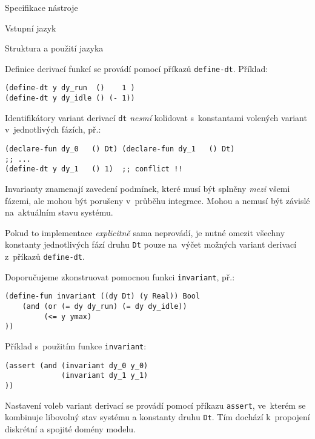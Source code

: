 \documentclass[thesis=M,czech]{FITthesis}[2012/06/26]
\newcommand{\id}[1]{\texttt{#1}}
\newcommand{\hl}[1]{\textit{#1}}
\begin{document}
\begin{section}{Specifikace nástroje}
\begin{subsection}{Vstupní jazyk}
\begin{subsubsection}{Struktura a použití jazyka}

\begin{paragraph}{Definice derivací funkcí}
\label{p:design:spec:ilang:struct:ode}
se provádí pomocí příkazů \id{define\--dt}.
Příklad:
\begin{Verbatim}[samepage=true]
(define-dt y dy_run  ()    1 )
(define-dt y dy_idle () (- 1))
\end{Verbatim}

Identifikátory variant derivací \id{dt}
\hl{nesmí} kolidovat s~konstantami
volených variant v~jednotlivých fázích, př.:
\begin{Verbatim}[samepage=true]
(declare-fun dy_0   () Dt) (declare-fun dy_1   () Dt)
;; ...
(define-dt y dy_1   () 1)  ;; conflict !!
\end{Verbatim}
\end{paragraph} %


\begin{paragraph}{Invarianty}
\label{p:design:spec:ilang:struct:inv}
znamenají zavedení podmínek,
které musí být splněny \hl{mezi} všemi fázemi,
ale mohou být porušeny v~průběhu integrace.
Mohou a nemusí být závislé na~aktuálním stavu systému.

Pokud to implementace \hl{explicitně} sama neprovádí,
je nutné omezit všechny konstanty jednotlivých fází druhu \id{Dt}
pouze na~výčet možných variant derivací z~příkazů \id{define\--dt}.

Doporučujeme zkonstruovat pomocnou funkci \id{invariant}, př.:
\begin{Verbatim}[samepage=true]
(define-fun invariant ((dy Dt) (y Real)) Bool
    (and (or (= dy dy_run) (= dy dy_idle))
         (<= y ymax)
))
\end{Verbatim}

Příklad s~použitím funkce \id{invariant}:
\begin{Verbatim}[samepage=true]
(assert (and (invariant dy_0 y_0)
             (invariant dy_1 y_1)
))
\end{Verbatim}
\end{paragraph} %


\begin{paragraph}{Nastavení voleb variant derivací}
\label{p:design:spec:ilang:struct:connect}
se provádí pomocí příkazu \id{assert},
ve~kterém se kombinuje libovolný stav systému
a konstanty druhu \id{Dt}.
Tím dochází k~propojení diskrétní a spojité domény modelu.


\end{paragraph}
\end{subsubsection}
\end{subsection}
\end{section}
\end{document}
